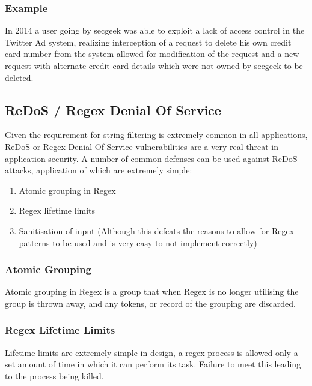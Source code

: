 \documentclass{IEEEtran}
\begin{document}
            \subsubsection{Example}
                In 2014 a user going by secgeek\cite{secgeek} was able to exploit a lack of access control in the 
                Twitter Ad system, realizing interception of a request to delete his own credit card number from 
                the system allowed for modification of the request and a new request with alternate credit 
                card details which were not owned by secgeek to be deleted.

        \newpage
        \subsection{ReDoS / Regex Denial Of Service}
            Given the requirement for string filtering is extremely common in all applications,
            ReDoS or Regex Denial Of Service\cite{ReDoS} vulnerabilities are a very real threat in application security.
            A number of common defenses can be used against ReDoS attacks, application of 
            which are extremely simple:
            \begin{enumerate}
                \item Atomic grouping in Regex
                \item Regex lifetime limits
                \item Sanitisation of input (Although this defeats the reasons to allow for
                Regex patterns to be used and is very easy to not implement correctly)
            \end{enumerate}

            \subsubsection{Atomic Grouping}
                Atomic grouping in Regex is a group that when Regex is no longer utilising 
                the group is thrown away, and any tokens, or record of the grouping are discarded.
            \subsubsection{Regex Lifetime Limits}
                Lifetime limits are extremely simple in design, a regex process is allowed only 
                a set amount of time in which it can perform its task. Failure to meet this 
                leading to the process being killed.
\end{document}

